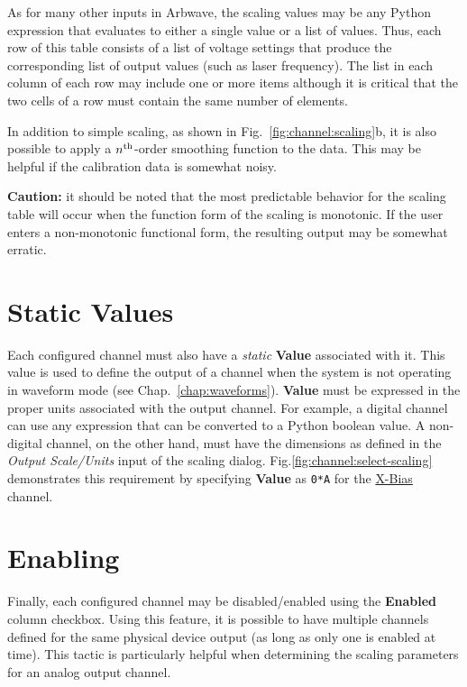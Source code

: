 As for many other inputs in Arbwave, the scaling values may be any Python
expression that evaluates to either a single value or a list of values.  Thus,
each row of this table consists of a list of voltage settings that produce the
corresponding list of output values (such as laser frequency).  The list in each
column of each row may include one or more items although it is critical that
the two cells of a row must contain the same number of elements.

In addition to simple scaling, as shown in Fig.~\ref{fig:channel:scaling}b, it is
also possible to apply a $n^{\rm th}$-order smoothing function to the data.
This may be helpful if the calibration data is somewhat noisy.

\textbf{Caution:}  it should be noted that the most predictable behavior for the
scaling table will occur when the function form of the scaling is monotonic.  If
the user enters a non-monotonic functional form, the resulting output may be
somewhat erratic.

\section{Static Values}\label{sec:channels:static}
Each configured channel must also have a \textit{static} \textbf{Value}
associated with it.  This value is used to define the output of a channel when
the system is not operating in waveform mode (see Chap.~\ref{chap:waveforms}).
\textbf{Value} must be expressed in the proper units associated with the output
channel.  For example, a digital channel can use any expression that can be
converted to a Python boolean value.  A non-digital channel, on the other hand,
must have the dimensions as defined in the \textit{Output Scale/Units} input of
the scaling dialog.  Fig.\ref{fig:channel:select-scaling} demonstrates this
requirement by specifying \textbf{Value} as \texttt{0*A} for the
\underline{X-Bias} channel.

\section{Enabling}\label{sec:channels:enable}
Finally, each configured channel may be disabled/enabled using the
\textbf{Enabled} column checkbox.  Using this feature, it is possible to have
multiple channels defined for the same physical device output (as long as only
one is enabled at time).  This tactic is particularly helpful when determining
the scaling parameters for an analog output channel.
